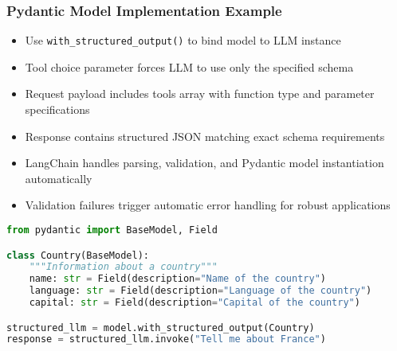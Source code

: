 \begin{frame}[fragile]\frametitle{Pydantic Model Implementation Example}
      \begin{itemize}
	\item Use \texttt{with\_structured\_output()} to bind model to LLM instance
	\item Tool choice parameter forces LLM to use only the specified schema
	\item Request payload includes tools array with function type and parameter specifications
	\item Response contains structured JSON matching exact schema requirements
	\item LangChain handles parsing, validation, and Pydantic model instantiation automatically
	\item Validation failures trigger automatic error handling for robust applications
	  \end{itemize}

\begin{lstlisting}[language=Python, basicstyle=\tiny]
from pydantic import BaseModel, Field

class Country(BaseModel):
    """Information about a country"""
    name: str = Field(description="Name of the country")
    language: str = Field(description="Language of the country")
    capital: str = Field(description="Capital of the country")

structured_llm = model.with_structured_output(Country)
response = structured_llm.invoke("Tell me about France")
\end{lstlisting}
\end{frame}


